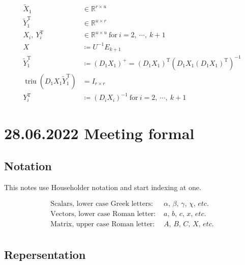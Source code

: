 \documentclass[11pt]{article}
\newcommand{\triu}{\mathop{\mathrm{triu}}}
\newcommand{\T}{\mathrm{T}}
\begin{document}
\begin{align*}
    \tilde{X}_{1} &\in \mathbb{R}^{r \times u} \\
    \tilde{Y}_{1}^{\T} &\in \mathbb{R}^{u \times r} \\
    X_{i},\ Y_{i}^{\T} &\in \mathbb{R}^{u \times u} \ \text{for} \ i = 2,\ \cdots,\ k+1 \\
    X &\coloneqq U^{-1} E_{k+1} \\
    \tilde{Y}_{1}^{\T} &\coloneqq (D_{1} X_{1})^{+} = (D_{1} X_{1})^{\T} (D_{1} X_{1} (D_{1} X_{1})^{\T})^{-1} \\
    \triu(D_{1} X_{1} \tilde{Y}_{1}^{\T}) &= I_{r \times r}\\
    Y_{i}^{\T} &\coloneqq (D_{i} X_{i})^{-1} \ \text{for}\ i = 2,\ \cdots,\ k+1 
\end{align*}



\newpage

\section{28.06.2022 Meeting formal}

\subsection{Notation}

\noindent This notes use Householder notation and start indexing at one.

\begin{align*}
    \text{Scalars, lower case Greek letters: }& \alpha,\, \beta,\, \gamma,\, \chi,\, etc.\\
    \text{Vectors, lower case Roman letter: }& a,\, b,\, c,\, x,\, etc.\\
    \text{Matrix, upper case Roman letter: }& A,\, B,\, C,\, X,\, etc.\\
\end{align*}

\subsection{Repersentation}
\end{document}
